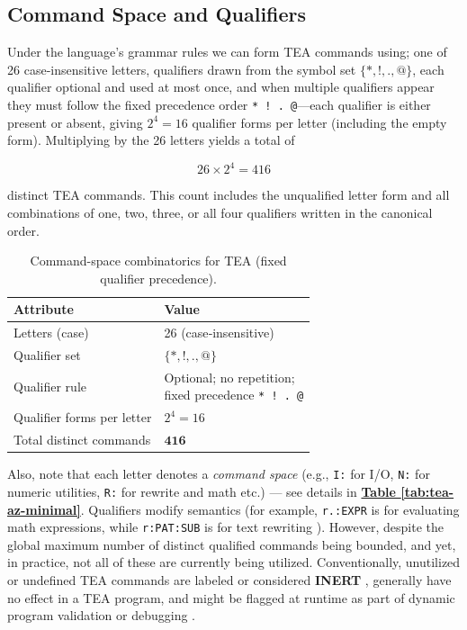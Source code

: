 \documentclass[acmtoplas]{acmart}
\begin{document}
\subsection{Command Space and Qualifiers}

\noindent Under the language's grammar rules \cite{Lutalo2024TEATAZ} we can form TEA commands using; one of 26 case‑insensitive letters, qualifiers drawn from the symbol set
$\{*,!,.,@\}$, each qualifier optional and used at most once, and when multiple qualifiers appear they must follow the fixed precedence order \texttt{* ! . @}---each qualifier is either present or absent, giving $2^{4}=16$ qualifier forms per letter (including the empty form). Multiplying by the 26 letters yields a total of

\vspace{1em}
\[
26 \times 2^{4} = 416
\]
\vspace{1em}

distinct TEA commands. This count includes the unqualified letter form and all combinations of one, two, three, or all four qualifiers written in the canonical order.

\begin{table}[ht]
  \centering
  \caption{Command-space combinatorics for TEA (fixed qualifier precedence).}
  \label{tab:tea-command-space}
  \begin{tabular}{@{}ll@{}}
    \hline
    \textbf{Attribute} & \textbf{Value} \\
    \hline
    Letters (case) & 26 (case‑insensitive) \\
    Qualifier set & \(\{*,!,.,@\}\) \\
    Qualifier rule & \makecell[l]{Optional; no repetition;\\fixed precedence \texttt{* ! . @}} \\
    Qualifier forms per letter & \(2^{4}=16\) \\
    Total distinct commands & \(\mathbf{416}\) \\
    \hline
  \end{tabular}
\end{table}


Also, note that each letter denotes a \emph{command space} (e.g., \texttt{I:} for I/O, \texttt{N:} for numeric utilities, \texttt{R:} for rewrite and math etc.) --- see details in \textbf{\hyperref[tab:tea-az-minimal]{Table \ref{tab:tea-az-minimal}}}. Qualifiers modify semantics (for example, \texttt{r.:EXPR} is for evaluating math expressions, while \texttt{r:PAT:SUB} is for text rewriting \cite{Lutalo2024TEATAZ}). However, despite the global maximum number of distinct qualified commands being bounded, and yet, in practice, not all of these are currently being utilized. Conventionally, unutilized or undefined TEA commands are labeled or considered \textbf{INERT} \cite{Lutalo2024TEATAZ}, generally have no effect in a TEA program, and might be flagged at runtime as part of dynamic program validation or debugging \cite{Lutalo2025debug}.
\end{document}
